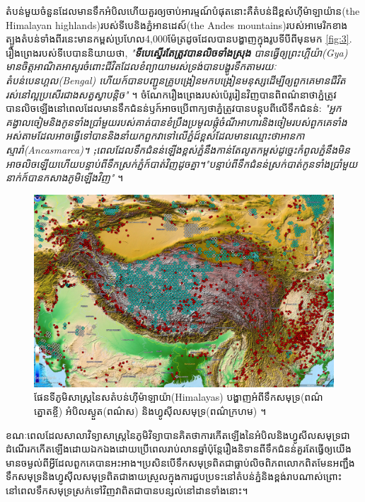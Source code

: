 \documentclass[10pt,twocolumn,letterpaper]{article}
\begin{document}
តំបន់មួយចំនួនដែលមានទឹកអំបិលហើយគួរឲ្យចាប់អារម្មណ៍បំផុតនោះគឺតំបន់ដីខ្ពស់ហ៊ីម៉ាឡាយ៉ាន​(the Himalayan highlands)របស់ទីបេ​និងភ្នំអានដេស៍(the Andes mountains)របស់អាមេរិកខាងត្បូង​តំបន់ទាំងពីរនេះមានកម្ពស់ប្រហែល​4,000ម៉ែត្រ​ដូចដែលបានបង្ហាញក្នុងរូបទីបីពីមុនមក \ref{fig:3}. រឿងព្រេងរបស់ទីបេបាននិយាយថា, \textit{"\textbf{ទីបេស្ទើរតែត្រូវបានលិចទាំងស្រុង} បានធ្វើឲ្យព្រះហ្គីយ៉ា(Gya) មានចិត្តអាណិតអាសូរចំពោះជីវិតដែលខំព្យាយាមរស់​ទ្រង់បានបង្ហូរទឹកតាមរយៈតំបន់បេនហ្គល(Bengal) ហើយក៍បានបញ្ជូនគ្រូបង្រៀនមកបង្រៀនមនុស្សដើម្បីឲ្យពួកគេមានជីវិតរស់នៅល្អប្រសើរជាងសត្វស្វាបន្តិច"} \cite{3}។ ចំណែករឿងព្រេងរបស់ប៉េរូរៀនវិញបានពិពណ៌នាថាភ្នំត្រូវបានលិចឡើងនៅពេលដែលមានទឹកជំនន់ឫក៍អាចប្រើពាក្យថាភ្នំត្រូវបានបន្តុបពីលើទឹកជំនន់: \textit{"អ្នកគង្វាលចៀម​និងកូនទាំងប្រាំមួយរបស់គាត់បានខំប្រឹងប្រមូលផ្តុំចំណីអាហារនិងចៀមរបស់ពួកគេទាំងអស់តាមដែលអាចធ្វើទៅបាន​និងនាំយកពួកវាទៅលើភ្នំដ៍ខ្ពស់ដែលមានឈ្មោះថា​អានកាស្មារ៉ា(Ancasmarca)។ \textbf;{ពេលដែលទឹកជំនន់ឡើងខ្ពស់​ភ្នំនឹងកាន់តែលូតកម្ពស់​ដូច្នេះកំពូលភ្នំនឹងមិនអាចលិចឡើយ​ហើយបន្ទាប់ពីទឹកស្រក់ភ្នំក៍បាត់វិញដូចគ្នា។"}បន្ទាប់ពីទឹកជំនន់ស្រក់បាត់កូនទាំងប្រាំមួយនាក់ក៍បានកសាងភូមិឡើងវិញ"} \cite{3}។ 

\begin{figure}[t]
\begin{center}
   \includegraphics[width=1\linewidth]{tibet.jpg}
\end{center}
   \caption{ផែនទីភូមិសាស្ត្រនៃសតំបន់ហ៊ីម៉ាឡាយ៉ា(Himalayas) បង្ហាញអំពីទឹកសមុទ្រ(ពណ៌ត្នោតខ្ចី) អំបិលស្ងួត(ពណ៌ស) និងហ្វូស៊ីលសមុទ្រ(ពណ៌ក្រហម) \cite{15,16,86,87}។}
\label{fig:3}
\label{fig:onecol}
\end{figure}

ខណៈពេលដែលសាលាវិទ្យាសាស្ត្រនៃភូមិវិទ្យាបានគិតថាការកើតឡើងនៃអំបិលនិងហ្វូសីលសមុទ្រជាដំណើរកកើតឡើងដោយឯកឯងដោយប្រើពេលរាប់លានឆ្នាំ​ប៉ុន្តែរឿងនិទានពីទឹកជំនន់គួរតែធ្វើឲ្យយើងមានចម្ងល់ពីអ្វីដែលពួកគេបានអះអាង។ប្រសិនបើទឹកសមុទ្រពិតជាធ្លាប់លិចពិភពលោកពិតមែន​អញ្ជឹងទឹកសមុទ្រនិងហ្វូស៊ីលសមុទ្រ​ពិតជាងាយស្រួលក្នុងការជួបប្រទះនៅតំបន់ភ្នំនិងខ្ពង់រាបណាស់​ព្រោះនៅពេលទឹកសមុទ្រស្រក់ទៅវិញវាពិតជាបានបន្សល់នៅដានទាំងនោះ។
\end{document}
